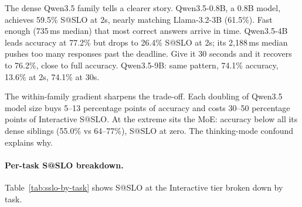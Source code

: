 \documentclass[11pt]{article}
\begin{document}
The dense Qwen3.5 family tells a clearer story.  Qwen3.5-0.8B, a 0.8B model, achieves 59.5\% S@SLO at 2s, nearly matching Llama-3.2-3B (61.5\%).  Fast enough (735\,ms median) that most correct answers arrive in time.  Qwen3.5-4B leads accuracy at 77.2\% but drops to 26.4\% S@SLO at 2s; its 2,188\,ms median pushes too many responses past the deadline.  Give it 30 seconds and it recovers to 76.2\%, close to full accuracy.  Qwen3.5-9B: same pattern, 74.1\% accuracy, 13.6\% at 2s, 74.1\% at 30s.

The within-family gradient sharpens the trade-off.  Each doubling of Qwen3.5 model size buys 5--13 percentage points of accuracy and costs 30--50 percentage points of Interactive S@SLO.  At the extreme sits the MoE: accuracy below all its dense siblings (55.0\% vs 64--77\%), S@SLO at zero.  The thinking-mode confound explains why.

\paragraph{Per-task S@SLO breakdown.}
Table~\ref{tab:sslo-by-task} shows S@SLO at the Interactive tier broken down by task.
\end{document}
